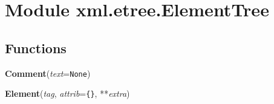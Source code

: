 %
%
%


\section{Module xml.etree.ElementTree}

    \label{xml:etree:ElementTree}


  \subsection{Functions}

    \label{xml:etree:ElementTree:Comment}

    \vspace{0.5ex}

\hspace{.8\funcindent}\begin{boxedminipage}{\funcwidth}

    \raggedright \textbf{Comment}(\textit{text}={\tt None})

\setlength{\parskip}{2ex}
\setlength{\parskip}{1ex}
    \end{boxedminipage}

    \label{xml:etree:ElementTree:Element}

    \vspace{0.5ex}

\hspace{.8\funcindent}\begin{boxedminipage}{\funcwidth}

    \raggedright \textbf{Element}(\textit{tag}, \textit{attrib}={\tt \texttt{\{}\texttt{\}}}, **\textit{extra})

\setlength{\parskip}{2ex}
\setlength{\parskip}{1ex}
    \end{boxedminipage}

